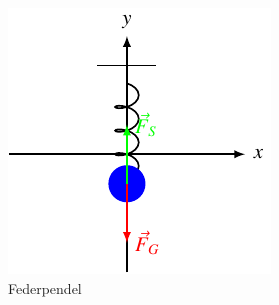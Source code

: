 %
%
%
\begin{figure}
\centering
\includegraphics{papers/fourier/images/federpendel.pdf}
\caption{Federpendel
\label{fourier:fig:federpendel}}
\end{figure}